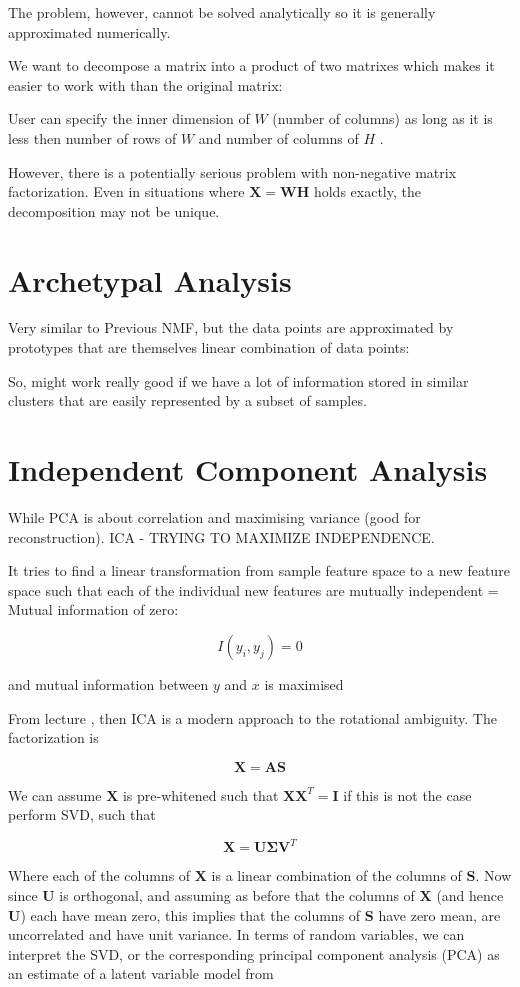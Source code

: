 The problem, however, cannot be solved analytically so it is generally approximated numerically.

We want to decompose a matrix into a product of two matrixes which makes it easier to work with
than the original matrix:

User can specify the inner dimension of $W$ (number of
columns) as long as it is less then number of rows of
$W$ and number of columns of $H$ .

However, there is a potentially serious problem with
non-negative matrix factorization. Even in situations where $\bm{X} = \bm{W} \bm{H}$ holds exactly, the decomposition may not be unique.

\section{Archetypal Analysis}

Very similar to Previous NMF, but the data points are approximated by prototypes that are
themselves linear combination of data points:

So, might work really good if we have a lot of information stored in similar clusters that are easily
represented by a subset of samples.

\section{Independent Component Analysis}

While PCA is about correlation and maximising variance (good
for reconstruction). ICA - TRYING TO MAXIMIZE INDEPENDENCE. 

It tries to find a linear transformation from sample feature space to a new feature space such that each of the individual new features are mutually independent = Mutual information of zero:

\[
    I(y_i, y_j) = 0
\]

and mutual information between $y$ and $x$ is maximised

From lecture \cite[p.~22]{lecture10}, then ICA is a modern approach to the rotational ambiguity. The factorization is

\[
    \bm{X} = \bm{A}\bm{S}
\]

We can assume $\bm{X}$ is pre-whitened such that $\bm{X}\bm{X}^T = \bm{I}$ if this is not the case perform SVD, such that

\[
    \bm{X} = \bm{U} \bm{\Sigma} \bm{V}^T
\]

Where each of the columns of $\bm{X}$ is a linear combination of the columns of $\bm{S}$. Now since $\bm{U}$ is orthogonal, and assuming as before that the columns of $\bm{X}$ (and hence $\bm{U}$) each have mean zero, this implies that the columns of $\bm{S}$ have zero mean, are uncorrelated and have unit variance. In terms of random variables, we can interpret the SVD, or the corresponding principal component analysis (PCA) as an estimate of a latent variable model from \cite[p.~558]{friedman2016elements}

